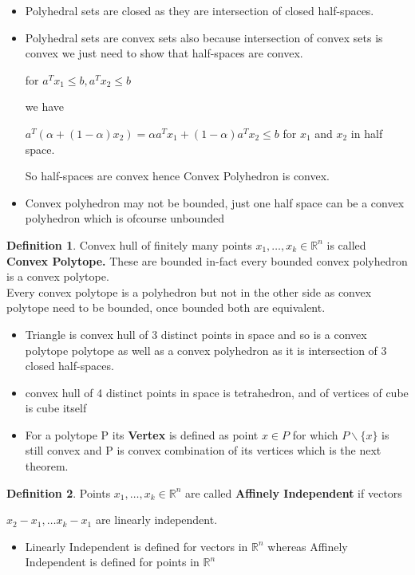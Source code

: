 \documentclass[oneside]{book}
\theoremstyle{definition}
\newtheorem{mydef}{Definition}[chapter]
\begin{document}
\begin{itemize}
\item
 Polyhedral sets are closed as they are intersection of closed half-spaces. 
  \item
 Polyhedral sets  are convex sets  also because intersection of convex sets is convex we just need to show that half-spaces are convex.\par
   for $a^{T} x_{1} \leq b, a^{T} x_{2} \leq b$ \par 
 we have 
 
 $a^{T}\left(\alpha +(1- \alpha) x_{2}\right)=\alpha a^{T} x_{1}+(1-\alpha) a^{T} x_{2} \leq b$ 
  for $x_{1} $ and $x_{2}$ in half space.  \par
  So half-spaces are convex hence  Convex Polyhedron  is convex.\par 
  \item
   Convex polyhedron may not be bounded, just one half space can be a convex polyhedron which is ofcourse unbounded 
   \end{itemize}
   
  \begin{mydef}
  
  Convex hull of finitely many points $x_1,\ldots ,x_k \in \mathbb{R}^n $ is called \textbf{Convex Polytope.} 
 These are bounded in-fact every bounded convex polyhedron  is a convex polytope.\\
  Every convex polytope is a polyhedron but not in the other side as convex  polytope need to be bounded, once bounded both are equivalent.
 
 
  \end{mydef}
  

\begin{itemize}
\item

Triangle is convex hull of 3 distinct points in space and so is a convex polytope polytope as well as a convex polyhedron as it is intersection of 3 closed half-spaces.

\item
  convex hull of 4 distinct points in space is tetrahedron, and of vertices of cube is cube itself 
 
 \item
 For a polytope P its \textbf{Vertex} is defined as point $x \in P$ for which $P \backslash \{x\} $ is  still convex and P is convex combination of its vertices which is  the next theorem. 
 \end{itemize}
\begin{mydef}

 Points $ x_1, \ldots ,x_k \in \mathbb{R}^n $ are called \textbf{Affinely Independent} if vectors \par
 $x_{2} - x_{1}, \ldots  x_{k} - x_{1} $ are linearly independent.
 \end{mydef}  
 \begin{itemize}
 \item Linearly Independent is defined for vectors in $\mathbb{R}^n $ whereas Affinely Independent is defined for points in $\mathbb{R}^n $
 \end{itemize}
\end{document}
